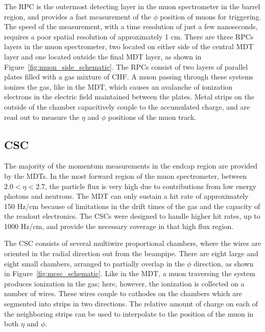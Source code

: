 The \ac{RPC} is the outermost detecting layer in the muon spectrometer in the barrel region, and provides a fast measurement of the $\phi$ position of muons for triggering.
The speed of the measurement, with a time resolution of just a few nanoseconds, requires a poor spatial resolution of approximately 1 cm. 
There are three \acp{RPC} layers in the muon spectrometer, two located on either side of the central \ac{MDT} layer and one located outside the final \ac{MDT} layer, as shown in Figure~\ref{fig:muon_side_schematic}.
The \acp{RPC} consist of two layers of parallel plates filled with a gas mixture of CHF.
A muon passing through these systems ionizes the gas, like in the \ac{MDT}, which causes an avalanche of ionization electrons in the electric field maintained between the plates.
Metal strips on the outside of the chamber capacitively couple to the accumulated charge, and are read out to measure the $\eta$ and $\phi$ positions of the muon track. 

\subsection{\acl{CSC}}
The majority of the momentum measurements in the endcap region are provided by the \acp{MDT}.
In the most forward region of the muon spectrometer, between $2.0 < \eta < 2.7$, the particle flux is very high due to contributions from low energy photons and neutrons.
The \ac{MDT} can only sustain a hit rate of approximately 150 Hz/cm because of limitations in the drift times of the gas and the capacity of the readout electronics. 
The \acp{CSC} were designed to handle higher hit rates, up to 1000 Hz/cm, and provide the necessary coverage in that high flux region.

The \ac{CSC} consists of several multiwire proportional chambers, where the wires are oriented in the radial direction out from the beampipe.
There are eight large and eight small chambers, arranged to partially overlap in the $\phi$ direction, as shown in Figure~\ref{fig:mcsc_schematic}.
Like in the \ac{MDT}, a muon traversing the system produces ionization in the gas; here, however, the ionization is collected on a number of wires.
These wires couple to cathodes on the chambers which are segmented into strips in two directions.
The relative amount of charge on each of the neighboring strips can be used to interpolate to the position of the muon in both $\eta$ and $\phi$. 

